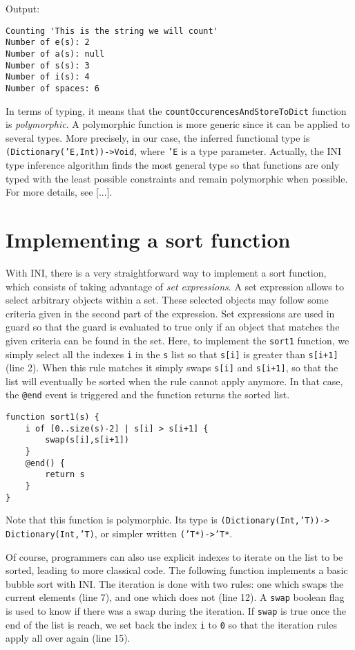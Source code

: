 \documentclass[11pt]{report}
\begin{document}
Output:

\begin{lstlisting}[numbers=none]
Counting 'This is the string we will count'
Number of e(s): 2
Number of a(s): null
Number of s(s): 3
Number of i(s): 4
Number of spaces: 6
\end{lstlisting}

In terms of typing, it means that the \texttt{countOccurencesAndStoreToDict} function is \emph{polymorphic}. A polymorphic function is more generic since it can be applied to several types. More precisely, in our case, the inferred functional type is \texttt{(Dictionary('E,Int))->Void}, where \texttt{'E} is a type parameter. Actually, the INI type inference algorithm finds the most general type so that functions are only typed with the least possible constraints and remain polymorphic when possible. For more details, see [...].

\section{Implementing a sort function\label{sec:implementing_a_sort_function}}

With INI, there is a very straightforward way to implement a sort function, which consists of taking advantage of \emph{set expressions}. A set expression allows to select arbitrary objects within a set. These selected objects may follow some criteria given in the second part of the expression. Set expressions are used in guard so that the guard is evaluated to true only if an object that matches the given criteria can be found in the set. Here, to implement the \texttt{sort1} function, we simply select all the indexes \texttt{i} in the \texttt{s} list so that \texttt{s[i]} is greater than \texttt{s[i+1]} (line 2). When this rule matches it simply swaps \texttt{s[i]} and \texttt{s[i+1]}, so that the list will eventually be sorted when the rule cannot apply anymore. In that case, the \texttt{@end} event is triggered and the function returns the sorted list.

\begin{lstlisting}
function sort1(s) {
	i of [0..size(s)-2] | s[i] > s[i+1] {
		swap(s[i],s[i+1])
	}
	@end() {
		return s
	}
}
\end{lstlisting}

Note that this function is polymorphic. Its type is \texttt{(Dictionary(Int,'T))->} \texttt{Dictionary(Int,'T)}, or simpler written \texttt{('T*)->'T*}.

Of course, programmers can also use explicit indexes to iterate on the list to be sorted, leading to more classical code. The following function implements a basic bubble sort with INI. The iteration is done with two rules: one which swaps the current elements (line 7), and one which does not (line 12). A \texttt{swap} boolean flag is used to know if there was a swap during the iteration. If \texttt{swap} is true once the end of the list is reach, we set back the index \texttt{i} to \texttt{0} so that the iteration rules apply all over again (line 15).
\end{document}
